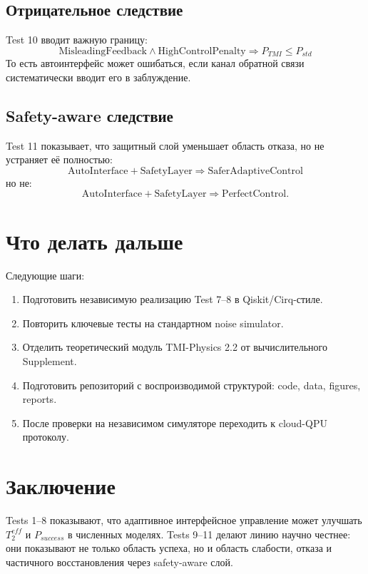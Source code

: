 \documentclass[12pt,a4paper]{article}
\begin{document}
\subsection{Отрицательное следствие}

Test 10 вводит важную границу:
\[
\boxed{
\text{MisleadingFeedback}\land\text{HighControlPenalty}
\Rightarrow
P_{TMI}\le P_{std}
}
\]
То есть автоинтерфейс может ошибаться, если канал обратной связи систематически вводит его в заблуждение.

\subsection{Safety-aware следствие}

Test 11 показывает, что защитный слой уменьшает область отказа, но не устраняет её полностью:
\[
\boxed{
\text{AutoInterface}+\text{SafetyLayer}
\Rightarrow
\text{SaferAdaptiveControl}
}
\]
но не:
\[
\text{AutoInterface}+\text{SafetyLayer}
\Rightarrow
\text{PerfectControl}.
\]

\section{Что делать дальше}

Следующие шаги:
\begin{enumerate}[label=\arabic*.]
\item Подготовить независимую реализацию Test 7--8 в Qiskit/Cirq-стиле.
\item Повторить ключевые тесты на стандартном noise simulator.
\item Отделить теоретический модуль TMI-Physics 2.2 от вычислительного Supplement.
\item Подготовить репозиторий с воспроизводимой структурой: code, data, figures, reports.
\item После проверки на независимом симуляторе переходить к cloud-QPU протоколу.
\end{enumerate}

\section{Заключение}

Tests 1--8 показывают, что адаптивное интерфейсное управление может улучшать $T_2^{eff}$ и $P_{success}$ в численных моделях. Tests 9--11 делают линию научно честнее: они показывают не только область успеха, но и область слабости, отказа и частичного восстановления через safety-aware слой.
\end{document}
